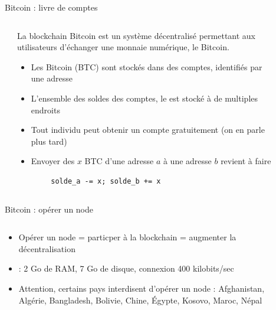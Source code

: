 \begin{frame}[fragile]{Bitcoin : livre de comptes}
  \begin{columns}
    \begin{column}{0.05\textwidth}
    \end{column}

    \begin{column}{0.65\textwidth}
      La blockchain Bitcoin est un système décentralisé permettant aux utilisateurs d'échanger une monnaie numérique, le Bitcoin.

      \begin{itemize}
        \item Les Bitcoin (BTC) sont stockés dans des comptes, identifiés par une adresse
        \item L'ensemble des soldes des comptes, le  est stocké à de multiples endroits
        \item Tout individu peut obtenir un compte gratuitement (on en parle plus tard)
        \item Envoyer des $x$ BTC d'une adresse $a$ à une adresse $b$ revient à faire
      \end{itemize}

      \begin{verbatim}
        solde_a -= x; solde_b += x
      \end{verbatim}
    \end{column}

    \begin{column}{0.2\textwidth}
      
    \end{column}

    \begin{column}{0.1\textwidth}
    \end{column}
  \end{columns}
\end{frame}

\begin{frame}{Bitcoin : opérer un node}
  \begin{columns}
    \begin{column}{0.5\textwidth}
      \begin{itemize}
        \item Opérer un node = particper à la blockchain = augmenter la décentralisation
        \item {} : 2 Go de RAM, 7 Go de disque, connexion 400 kilobits/sec
        \item Attention, certains pays interdisent d'opérer un node : Afghanistan, Algérie, Bangladesh, Bolivie, Chine, Égypte, Kosovo, Maroc, Népal
      \end{itemize}
    \end{column}

    \begin{column}{0.5\textwidth}
      
    \end{column}
  \end{columns}
\end{frame}

